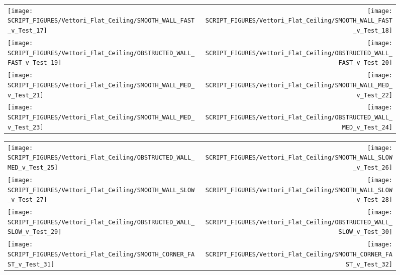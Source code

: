 \begin{figure}[!ht]
\begin{tabular*}{\textwidth}{l@{\extracolsep{\fill}}r}
\texttt{[image: SCRIPT\_FIGURES/Vettori\_Flat\_Ceiling/SMOOTH\_WALL\_FAST\_v\_Test\_17]} &
\texttt{[image: SCRIPT\_FIGURES/Vettori\_Flat\_Ceiling/SMOOTH\_WALL\_FAST\_v\_Test\_18]} \\
\texttt{[image: SCRIPT\_FIGURES/Vettori\_Flat\_Ceiling/OBSTRUCTED\_WALL\_FAST\_v\_Test\_19]} &
\texttt{[image: SCRIPT\_FIGURES/Vettori\_Flat\_Ceiling/OBSTRUCTED\_WALL\_FAST\_v\_Test\_20]} \\
\texttt{[image: SCRIPT\_FIGURES/Vettori\_Flat\_Ceiling/SMOOTH\_WALL\_MED\_v\_Test\_21]} &
\texttt{[image: SCRIPT\_FIGURES/Vettori\_Flat\_Ceiling/SMOOTH\_WALL\_MED\_v\_Test\_22]} \\
\texttt{[image: SCRIPT\_FIGURES/Vettori\_Flat\_Ceiling/SMOOTH\_WALL\_MED\_v\_Test\_23]} &
\texttt{[image: SCRIPT\_FIGURES/Vettori\_Flat\_Ceiling/OBSTRUCTED\_WALL\_MED\_v\_Test\_24]} \\
\end{tabular*}
\label{Vettori_3}
\end{figure}

\begin{figure}[!ht]
\begin{tabular*}{\textwidth}{l@{\extracolsep{\fill}}r}
\texttt{[image: SCRIPT\_FIGURES/Vettori\_Flat\_Ceiling/OBSTRUCTED\_WALL\_MED\_v\_Test\_25]} &
\texttt{[image: SCRIPT\_FIGURES/Vettori\_Flat\_Ceiling/SMOOTH\_WALL\_SLOW\_v\_Test\_26]} \\
\texttt{[image: SCRIPT\_FIGURES/Vettori\_Flat\_Ceiling/SMOOTH\_WALL\_SLOW\_v\_Test\_27]} &
\texttt{[image: SCRIPT\_FIGURES/Vettori\_Flat\_Ceiling/SMOOTH\_WALL\_SLOW\_v\_Test\_28]} \\
\texttt{[image: SCRIPT\_FIGURES/Vettori\_Flat\_Ceiling/OBSTRUCTED\_WALL\_SLOW\_v\_Test\_29]} &
\texttt{[image: SCRIPT\_FIGURES/Vettori\_Flat\_Ceiling/OBSTRUCTED\_WALL\_SLOW\_v\_Test\_30]} \\
\texttt{[image: SCRIPT\_FIGURES/Vettori\_Flat\_Ceiling/SMOOTH\_CORNER\_FAST\_v\_Test\_31]} &
\texttt{[image: SCRIPT\_FIGURES/Vettori\_Flat\_Ceiling/SMOOTH\_CORNER\_FAST\_v\_Test\_32]} \\
\end{tabular*}
\label{Vettori_4}
\end{figure}

